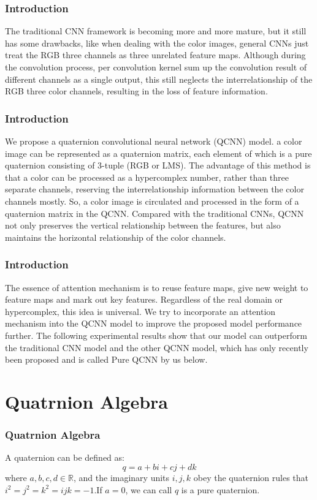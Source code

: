 \documentclass{beamer}
\begin{document}
\begin{frame}
    \frametitle{Introduction}
The traditional CNN framework is becoming more and more mature, but it still has some drawbacks, like when dealing with the color images, general CNNs just treat the RGB three channels as three unrelated feature maps. Although during the convolution process, per convolution kernel sum up the convolution result of different channels as a single output, this still neglects the interrelationship of the RGB three color channels, resulting in the loss of feature information.
\end{frame}

\begin{frame}
    \frametitle{Introduction}
We propose a quaternion convolutional neural network (QCNN) model. a color image can be represented as a quaternion
matrix, each element of which is a pure quaternion consisting of 3-tuple (RGB or LMS). The advantage of this method is that a color can be processed as a hypercomplex number, rather than three separate channels, reserving the interrelationship information between the color channels mostly. So, a color image is circulated and processed in the form of a quaternion matrix in the QCNN. Compared with the traditional CNNs, QCNN not only preserves the vertical relationship between the features, but also maintains the horizontal relationship of the color channels.
\end{frame}

\begin{frame}
    \frametitle{Introduction}
The essence of attention mechanism is to reuse feature maps, give new weight to feature maps and mark out key features. Regardless of the real domain or hypercomplex, this idea is universal. We try to incorporate an attention mechanism into the QCNN model to improve the proposed model performance further. The following experimental results show that our model can outperform the traditional CNN model and the other QCNN model, which has only recently been proposed and is called Pure QCNN by us below.
\end{frame}


\section{Quatrnion Algebra}
\begin{frame}
    \frametitle{Quatrnion Algebra}
A quaternion can be defined as:
$$q=a+bi+cj+dk$$
where $a,b,c,d\in \mathbb{R}$, and the imaginary units $i,j,k$ obey the quaternion rules that $i^2=j^2=k^2=ijk=-1$.If $a = 0$, we can call $q$ is a pure quaternion.
\end{frame}
\end{document}
